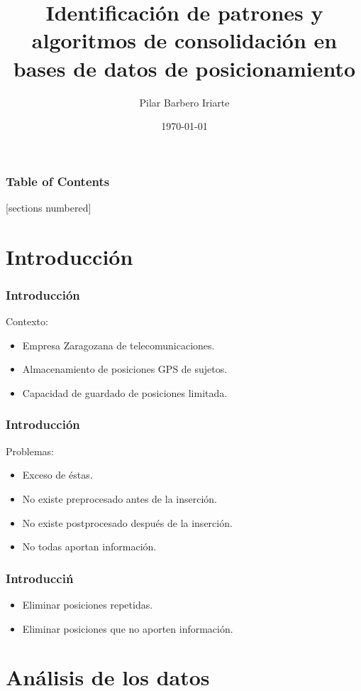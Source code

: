 \documentclass[10pt, spanish]{beamer}
\title{Identificaci\'on de patrones y algoritmos de consolidaci\'on en bases de datos de posicionamiento}
\date{\today}
\author{Pilar Barbero Iriarte}
\institute{Universidad de Zaragoza}
\begin{document}
\maketitle

\begin{frame}
  \frametitle{Table of Contents}
  [sections numbered]
  \tableofcontents[hideallsubsections]
\end{frame}

\section{Introducci\'on}

\begin{frame}[fragile]
\frametitle{Introducci\'on}
Contexto: 
\begin{itemize}
	\item Empresa Zaragozana de telecomunicaciones.
	\item Almacenamiento de posiciones GPS de sujetos.
	\item Capacidad de guardado de posiciones limitada.
\end{itemize}
\end{frame}


\begin{frame}[fragile]
\frametitle{Introducci\'on}
Problemas:
	\begin{itemize}
		\item Exceso de \'estas.
		\item No existe preprocesado antes de la inserci\'on.
		\item No existe postprocesado despu\'es de la inserci\'on.
		\item No todas aportan informaci\'on.
	\end{itemize}
\end{frame}

\begin{frame}[fragile]
  \frametitle{Introducci\'n}
  \begin{itemize}
  	  \item Eliminar posiciones repetidas.
  	  \item Eliminar posiciones que no aporten informaci\'on.
   \end{itemize}
\end{frame}

\section{An\'alisis de los datos}
\end{document}
